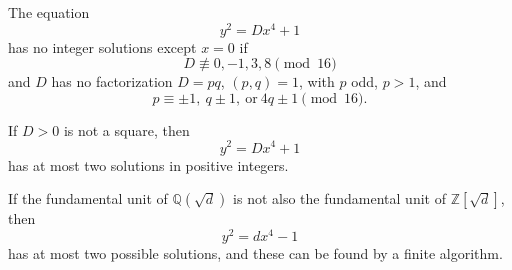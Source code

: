 \begin{proposition}
    The equation
\[
    y^2=Dx^4+1
\]
    has no integer solutions except $x=0$ if
\[
    D\not\equiv0,-1,3,8\pmod{16}
\]
    and $D$ has no factorization $D=pq$, $(p,q)=1$, with $p$ odd, $p>1$, and
\[
    p\equiv\pm1,\ q\pm1,\ \text{or}\ 4q\pm1\pmod{16}.
\]
\end{proposition}

\begin{proposition}
    If $D>0$ is not a square, then
\[
    y^2=Dx^4+1
\]
    has at most two solutions in positive integers.
\end{proposition}

\begin{proposition}
    If the fundamental unit of $\mathbb{Q}(\sqrt{d})$ is not also the fundamental unit of $\mathbb{Z}[\sqrt{d}]$, then
\[
    y^2=dx^4-1
\]
    has at most two possible solutions, and these can be found by a finite algorithm.
\end{proposition}
